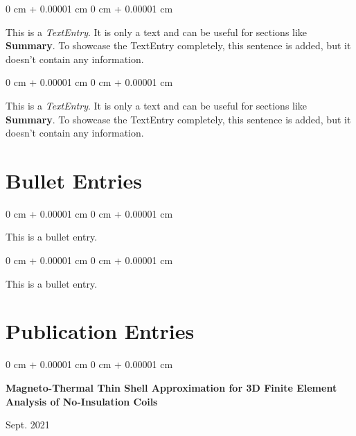 \documentclass[10pt, letterpaper]{article}
\newenvironment{onecolentry}{
    \begin{adjustwidth}{
        0 cm + 0.00001 cm
    }{
        0 cm + 0.00001 cm
    }
}{
    \end{adjustwidth}
} %
\newenvironment{twocolentry}[2][]{
    \onecolentry
    \def\secondColumn{#2}
    \setcolumnwidth{\fill, 4.1 cm}
    \begin{paracol}{2}
}{
    \switchcolumn \raggedleft \secondColumn
    \end{paracol}
    \endonecolentry
} %
\begin{document}
        \vspace{0.15 cm}

        \begin{onecolentry}
            This is a \textit{TextEntry}. It is only a text and can be useful for sections like \textbf{Summary}. To showcase the TextEntry completely, this sentence is added, but it doesn't contain any information.
        \end{onecolentry}

        \vspace{0.15 cm}

        \begin{onecolentry}
            This is a \textit{TextEntry}. It is only a text and can be useful for sections like \textbf{Summary}. To showcase the TextEntry completely, this sentence is added, but it doesn't contain any information.
        \end{onecolentry}


    
    \section{Bullet Entries}

        
        \begin{onecolentry}
            \textbullet \hspace{3pt} This is a bullet entry.
        \end{onecolentry}

        \vspace{0.15 cm}

        \begin{onecolentry}
            \textbullet \hspace{3pt} This is a bullet entry.
        \end{onecolentry}


    
    \section{Publication Entries}

        
        \begin{samepage}
            \begin{twocolentry}{
                Sept. 2021
            }
                \textbf{Magneto-Thermal Thin Shell Approximation for 3D Finite Element Analysis of No-Insulation Coils}
            \end{twocolentry}

        \end{samepage}
\end{document}
